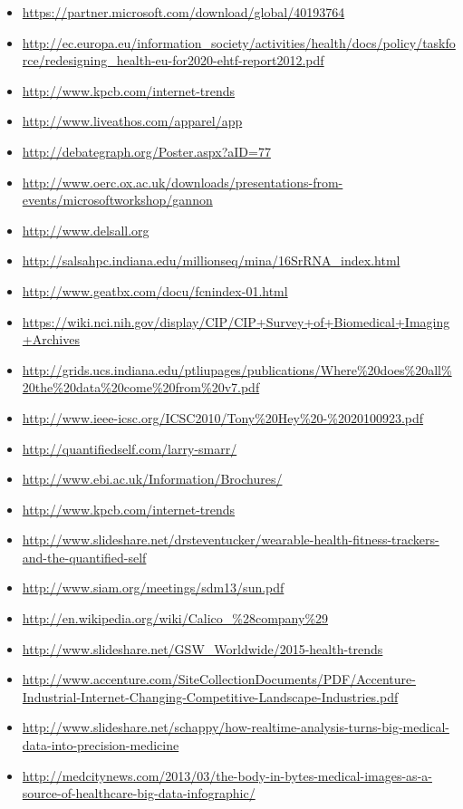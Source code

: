 \begin{itemize}
\item
  \url{https://partner.microsoft.com/download/global/40193764}
\item
  \url{http://ec.europa.eu/information_society/activities/health/docs/policy/taskforce/redesigning_health-eu-for2020-ehtf-report2012.pdf}
\item
  \url{http://www.kpcb.com/internet-trends}
\item
  \url{http://www.liveathos.com/apparel/app}
\item
  \url{http://debategraph.org/Poster.aspx?aID=77}
\item
  \url{http://www.oerc.ox.ac.uk/downloads/presentations-from-events/microsoftworkshop/gannon}
\item
  \url{http://www.delsall.org}
\item
  \url{http://salsahpc.indiana.edu/millionseq/mina/16SrRNA_index.html}
\item
  \url{http://www.geatbx.com/docu/fcnindex-01.html}
\item
  \url{https://wiki.nci.nih.gov/display/CIP/CIP+Survey+of+Biomedical+Imaging+Archives}
\item
  \url{http://grids.ucs.indiana.edu/ptliupages/publications/Where\%20does\%20all\%20the\%20data\%20come\%20from\%20v7.pdf}
\item
  \url{http://www.ieee-icsc.org/ICSC2010/Tony\%20Hey\%20-\%2020100923.pdf}
\item
  \url{http://quantifiedself.com/larry-smarr/}
\item
  \url{http://www.ebi.ac.uk/Information/Brochures/}
\item
  \url{http://www.kpcb.com/internet-trends}
\item
  \url{http://www.slideshare.net/drsteventucker/wearable-health-fitness-trackers-and-the-quantified-self}
\item
  \url{http://www.siam.org/meetings/sdm13/sun.pdf}
\item
  \url{http://en.wikipedia.org/wiki/Calico_\%28company\%29}
\item
  \url{http://www.slideshare.net/GSW_Worldwide/2015-health-trends}
\item
  \url{http://www.accenture.com/SiteCollectionDocuments/PDF/Accenture-Industrial-Internet-Changing-Competitive-Landscape-Industries.pdf}
\item
  \url{http://www.slideshare.net/schappy/how-realtime-analysis-turns-big-medical-data-into-precision-medicine}
\item
  \url{http://medcitynews.com/2013/03/the-body-in-bytes-medical-images-as-a-source-of-healthcare-big-data-infographic/}

\end{itemize}
